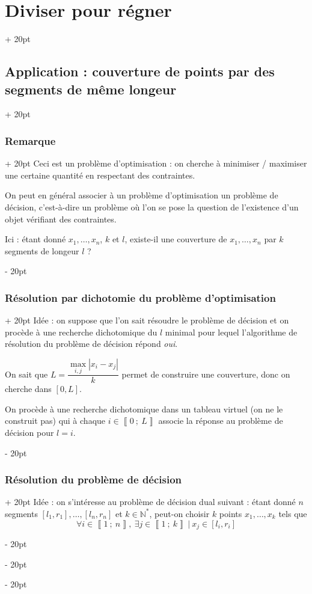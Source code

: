 \documentclass[a4paper, 12pt, twoside]{article}
\newcommand{\N}{\mathbb{N}} %
\newcommand{\nset}[2]{\left\llbracket #1\ ;\ #2 \right\rrbracket}
\newcommand{\abs}[1]{\left\lvert #1 \right\rvert} %
\newcommand{\ind}[1][20pt]{\advance\leftskip + #1}
\newcommand{\deind}[1][20pt]{\advance\leftskip - #1}
\newenvironment{indt}[2][20pt]{#2 \par \ind[#1]}{\par \deind} %
\begin{document}
\begin{indt}{\section{Diviser pour régner}}
\begin{indt}{\subsection{Application : couverture de points par des segments de même longeur}}
            \vspace{12pt}
            
            \begin{indt}{\subsubsection{Remarque}}
                Ceci est un problème d'optimisation : on cherche à minimiser / maximiser une certaine quantité en respectant des contraintes.
                
                On peut en général associer à un problème d'optimisation un problème de décision, c'est-à-dire un problème où l'on se pose la question de l'existence d'un objet vérifiant des contraintes.
                
                Ici : étant donné $x_1, \ldots, x_n$, $k$ et $l$, existe-il une couverture de $x_1, \ldots, x_n$ par $k$ segments de longeur $l$ ?
            \end{indt}
            
            \vspace{12pt}
            
            \begin{indt}{\subsubsection{Résolution par dichotomie du problème d'optimisation}}
                Idée : on suppose que l'on sait résoudre le problème de décision et on procède à une recherche dichotomique du $l$ minimal pour lequel l'algorithme de résolution du problème de décision répond \textit{oui}.
                
                On sait que $L = \dfrac{\max\limits_{i, j}\abs{x_i - x_j}}{k}$ permet de construire une couverture, donc on cherche dans $[0, L]$.
                
                On procède à une recherche dichotomique dans un tableau virtuel (on ne le construit pas) qui à chaque $i \in \nset 0 L$ associe la réponse au problème de décision pour $l = i$.
            \end{indt}
            
            \vspace{12pt}
            
            \begin{indt}{\subsubsection{Résolution du problème de décision}}
                Idée : on s'intéresse au problème de décision dual suivant : étant donné $n$ segments $[l_1, r_1], \ldots, [l_n, r_n]$ et $k \in \N^*$, peut-on choisir $k$ points $x_1, \ldots, x_k$ tels que
                    \[ \forall i \in \nset 1 n,\ \exists j \in \nset 1 k\ |\ x_j \in [l_i, r_i] \]
                

\end{indt}
\end{indt}
\end{indt}
\end{document}
